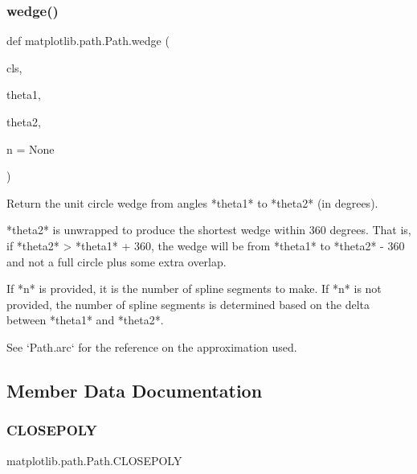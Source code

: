 \mbox{\label{classmatplotlib_1_1path_1_1Path_ae2412176d4ed34f94addd95f00ffa696}} 
\subsubsection{\texorpdfstring{wedge()}{wedge()}}
{\footnotesize\ttfamily def matplotlib.\+path.\+Path.\+wedge (\begin{DoxyParamCaption}\item[{}]{cls,  }\item[{}]{theta1,  }\item[{}]{theta2,  }\item[{}]{n = {\ttfamily None} }\end{DoxyParamCaption})}

\begin{DoxyVerb}Return the unit circle wedge from angles *theta1* to *theta2* (in
degrees).

*theta2* is unwrapped to produce the shortest wedge within 360 degrees.
That is, if *theta2* > *theta1* + 360, the wedge will be from *theta1*
to *theta2* - 360 and not a full circle plus some extra overlap.

If *n* is provided, it is the number of spline segments to make.
If *n* is not provided, the number of spline segments is
determined based on the delta between *theta1* and *theta2*.

See `Path.arc` for the reference on the approximation used.
\end{DoxyVerb}
 

\subsection{Member Data Documentation}
\mbox{\label{classmatplotlib_1_1path_1_1Path_a02575b90932a2331c8e95fce7b11848c}} 
\subsubsection{\texorpdfstring{C\+L\+O\+S\+E\+P\+O\+LY}{CLOSEPOLY}}
{\footnotesize\ttfamily matplotlib.\+path.\+Path.\+C\+L\+O\+S\+E\+P\+O\+LY\hspace{0.3cm}{\ttfamily [static]}}

